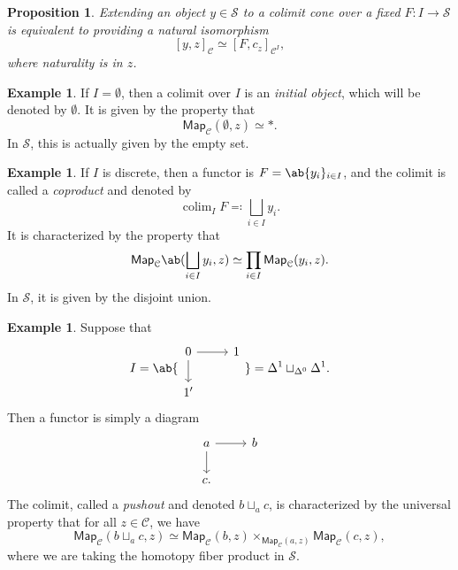 \documentclass[10pt]{amsart}
\newtheorem{prop}[thm]{Proposition}
\theoremstyle{definition}
\newtheorem{exm}[thm]{Example}
\theoremstyle{remark}
\theoremstyle{plain}
\theoremstyle{definition}
\theoremstyle{remark}
\newcommand{\mc}[1]{\mathcal{#1}}
\newcommand{\ms}[1]{\mathsf{#1}}
\newcommand{\1}{\mathbf{1}}
\newcommand{\2}{\mathbf{2}}
\newcommand{\3}{\mathbf{3}}
\DeclareMathOperator*{\colim}{colim}
\begin{document}
\begin{prop}
    Extending an object $y \in \mc{S}$ to a colimit cone over a fixed $F \colon I \to \mc{S}$ is equivalent to providing a natural isomorphism
    \[ [y, z]_{\mc{C}} \simeq [F, c_z]_{\mc{C}^I}, \]
    where naturality is in $z$.
\end{prop}

\begin{exm}
    If $I = \emptyset$, then a colimit over $I$ is an \textit{initial object}, which will be denoted by $\emptyset$. It is given by the property that
    \[ \ms{Map}_{\mc{C}}(\emptyset, z) \simeq *. \]
    In $\mc{S}$, this is actually given by the empty set.
\end{exm}

\begin{exm}
    If $I$ is discrete, then a functor is $F = \ab\{y_i \}_{i \in I}$, and the colimit is called a \textit{coproduct} and denoted by
    \[ \colim_I F \eqqcolon \bigsqcup_{i \in I} y_i. \]
    It is characterized by the property that
    \[ \ms{Map}_{\mc{C}}\ab(\bigsqcup_{i\in I} y_i, z) \simeq \prod_{i \in I} \ms{Map}_{\mc{C}}(y_i, z). \]
    In $\mc{S}$, it is given by the disjoint union.
\end{exm}

\begin{exm}
    Suppose that
    \begin{equation*}I = \ab\{
    \begin{tikzcd}[ampersand replacement=\&]
        0 \ar{r} \ar{d} \& 1 \\
        1' 
    \end{tikzcd} \} = \Delta^1 \sqcup_{\Delta^0} \Delta^1.
    \end{equation*}
    Then a functor is simply a diagram
    \begin{equation*}
    \begin{tikzcd}
        a \ar{r} \ar{d} & b \\
        c.
    \end{tikzcd}
    \end{equation*}
    The colimit, called a \textit{pushout} and denoted $b \sqcup_a c$, is characterized by the universal property that for all $z \in \mc{C}$, we have
    \[ \ms{Map}_{\mc{C}}(b \sqcup_a c, z) \simeq \ms{Map}_{\mc{C}}(b, z) \times_{\ms{Map}_{\mc{C}}(a, z)} \ms{Map}_{\mc{C}}(c, z), \]
    where we are taking the homotopy fiber product in $\mc{S}$.
\end{exm}
\end{document}
